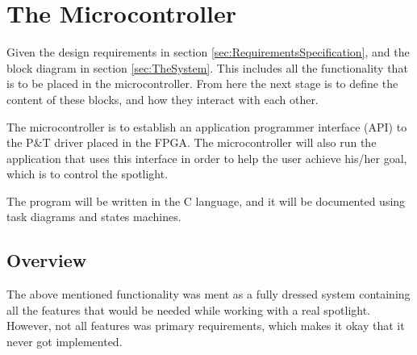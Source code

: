 




\section{The Microcontroller}
\label{sec:TheMicrocontroller}

 Given the design requirements in section \ref{sec:RequirementsSpecification}, and the block diagram in section \ref{sec:TheSystem}. This includes all the functionality that is to be placed in the microcontroller. From here the next stage is to define the content of these blocks, and how they interact with each other. 
 
 The microcontroller is to establish an application programmer interface (API) to the P\&T driver placed in the FPGA. The microcontroller will also run the application that uses this interface in order to help the user achieve his/her goal, which is to control the spotlight.
 
 The program will be written in the C language, and it will be documented using task diagrams and states machines. 




















\subsection{Overview}
The above mentioned functionality was ment as a fully dressed system containing all the features that would be needed while working with a real spotlight. However, not all features was primary requirements, which makes it okay that it never got implemented. 
 
